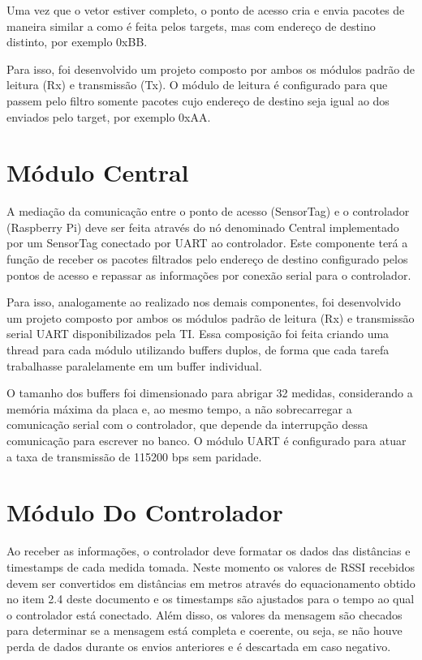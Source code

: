 Uma vez que o vetor estiver completo, o ponto de acesso cria e envia pacotes de maneira similar a como é feita pelos targets, mas com endereço de destino distinto, por exemplo 0xBB.

Para isso, foi desenvolvido um projeto composto por ambos os módulos padrão de leitura (Rx) e transmissão (Tx). O módulo de leitura é configurado para que passem pelo filtro somente pacotes cujo endereço de destino seja igual ao dos enviados pelo target, por exemplo 0xAA.

\section{Módulo Central}

A mediação da comunicação entre o ponto de acesso (SensorTag) e o controlador (Raspberry Pi) deve ser feita através do nó denominado Central implementado por um SensorTag conectado por UART ao controlador.
Este componente terá a função de receber os pacotes filtrados pelo endereço de destino configurado pelos pontos de acesso e repassar as informações por conexão serial para o controlador.

Para isso, analogamente ao realizado nos demais componentes, foi desenvolvido um projeto composto por ambos os módulos padrão de leitura (Rx) e transmissão serial UART disponibilizados pela TI. Essa composição foi feita criando uma thread para cada módulo utilizando buffers duplos, de forma que cada tarefa trabalhasse paralelamente em um buffer individual.

O tamanho dos buffers foi dimensionado para abrigar 32 medidas, considerando a memória máxima da placa e, ao mesmo tempo, a não sobrecarregar a comunicação serial com o controlador, que depende da interrupção dessa comunicação para escrever no banco. O módulo UART é configurado para atuar a taxa de transmissão de 115200 bps sem paridade.

\section{Módulo Do Controlador}

Ao receber as informações, o controlador deve formatar os dados das distâncias e timestamps de cada medida tomada. Neste momento os valores de RSSI recebidos devem ser convertidos em distâncias em metros através do equacionamento obtido no item 2.4 deste documento e os timestamps são ajustados para o tempo ao qual o controlador está conectado. Além disso, os valores da mensagem são checados para determinar se a mensagem está completa e coerente, ou seja, se não houve perda de dados durante os envios anteriores e é descartada em caso negativo.

